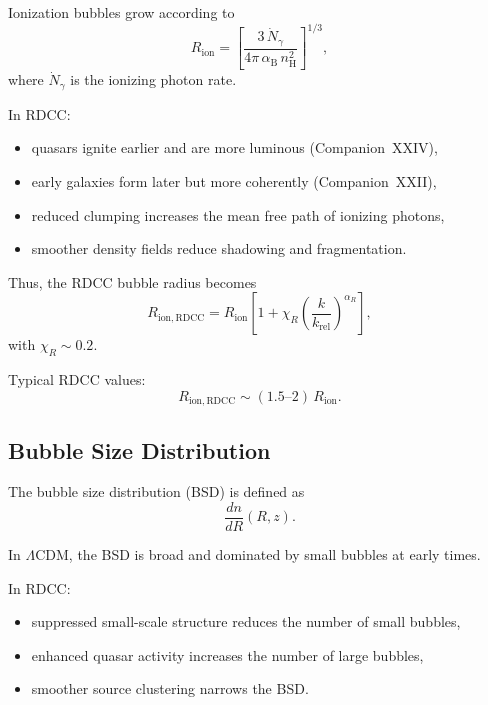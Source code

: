 \documentclass[11pt,a4paper]{article}
\begin{document}
Ionization bubbles grow according to
\begin{equation}
R_{\mathrm{ion}}
=
\left[
\frac{3\,\dot{N}_{\gamma}}
{4\pi\,\alpha_{\mathrm{B}}\,n_{\mathrm{H}}^{2}}
\right]^{1/3},
\end{equation}
where $\dot{N}_{\gamma}$ is the ionizing photon rate.

In RDCC:
\begin{itemize}
\item quasars ignite earlier and are more luminous (Companion~XXIV),
\item early galaxies form later but more coherently (Companion~XXII),
\item reduced clumping increases the mean free path of ionizing photons,
\item smoother density fields reduce shadowing and fragmentation.
\end{itemize}

Thus, the RDCC bubble radius becomes
\begin{equation}
R_{\mathrm{ion,RDCC}}
=
R_{\mathrm{ion}}
\left[
1
+
\chi_{R}
\left(
\frac{k}{k_{\mathrm{rel}}}
\right)^{\alpha_{R}}
\right],
\end{equation}
with $\chi_{R} \sim 0.2$.

Typical RDCC values:
\begin{equation}
R_{\mathrm{ion,RDCC}}
\sim
(1.5\text{--}2)\,R_{\mathrm{ion}}.
\end{equation}

\subsection{Bubble Size Distribution}

The bubble size distribution (BSD) is defined as
\begin{equation}
\frac{dn}{dR}(R,z).
\end{equation}

In $\Lambda$CDM, the BSD is broad and dominated by small bubbles at early times.

In RDCC:
\begin{itemize}
\item suppressed small-scale structure reduces the number of small bubbles,
\item enhanced quasar activity increases the number of large bubbles,
\item smoother source clustering narrows the BSD.
\end{itemize}
\end{document}
